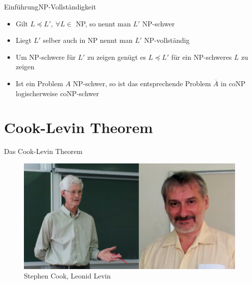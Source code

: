 \documentclass[ignorenonframetext,]{beamer}
\begin{document}
\begin{frame}{Einführung}{NP-Vollständigkeit}

\begin{itemize}
\itemsep1pt\parskip0pt
\item
  Gilt $L \preceq L',\ \forall L \in$ NP, so nennt man $L'$ NP-schwer
\item
  Liegt $L'$ selber auch in NP nennt man $L'$ NP-vollständig
\item
  Um NP-schwere für $L'$ zu zeigen genügt es $L \preceq L'$ für ein
  NP-schweres $L$ zu zeigen
\item
  Ist ein Problem $A$ NP-schwer, so ist das entsprechende Problem
  $\overline{A}$ in coNP logischerweise coNP-schwer
\end{itemize}

\end{frame}

\section{Cook-Levin Theorem}\label{cook-levin-theorem}

\begin{frame}{Das Cook-Levin Theorem}

\begin{figure}[htbp]
\centering
\includegraphics{img/cook_levin.png}\\

Stephen Cook, Leonid Levin
\end{figure}

\end{frame}
\end{document}
